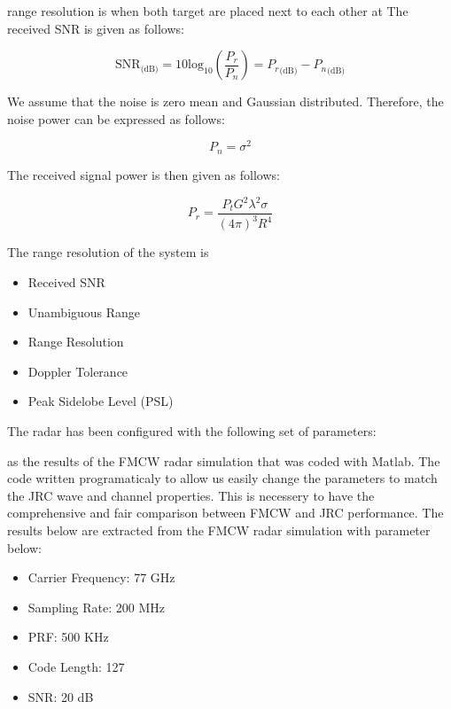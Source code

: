 \documentclass[conference]{IEEEtran}
\begin{document}
	range resolution is when both target are placed next to each other at 
	The received SNR is given as follows:
	
	\begin{equation}
		\text{SNR}_{\text{(dB)}} = 10\text{log}_{10}\left(\frac{P_r}{P_n}\right) = {P_r}_{\text{(dB)}} - {P_n}_{\text{(dB)}}
	\end{equation}
		
	We assume that the noise is zero mean and Gaussian distributed. Therefore, the noise power can be expressed as follows:
	
	\begin{equation}
		P_n = \sigma^2
	\end{equation}
	
	 The received signal power is then given as follows:
	 
	 \begin{equation}
	 	P_r = \frac{P_tG^2\lambda^2\sigma}{(4{\pi})^3R^4}
	 \end{equation}
	 
	 The range resolution of the system is 
	
	\begin{itemize}
		\item Received SNR
		\item Unambiguous Range
		\item Range Resolution
		\item Doppler Tolerance
		\item Peak Sidelobe Level (PSL)
	\end{itemize}

The radar has been configured with the following set of parameters:

 as the results of the FMCW radar simulation that was coded with Matlab. The code written programaticaly to allow us easily change the parameters to match the JRC wave and channel properties. This is necessery to have the comprehensive and fair comparison between FMCW and JRC performance. 
The results below are extracted from the FMCW  radar simulation with parameter below:

	
	
	\begin{itemize}
	\item Carrier Frequency:	77 GHz
	\item Sampling Rate:		200 MHz
	\item PRF:				500 KHz
	\item Code Length:		127
	\item SNR:				20 dB
	\end{itemize}
	
\end{document}
